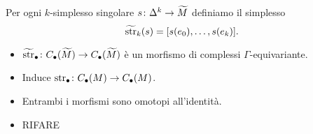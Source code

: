 \documentclass{beamer}
\begin{document}
\begin{frame}{\secname}{\subsecname}
Per ogni $k$-simplesso singolare $\map{s}{\Delta^k}{\widetilde M}$ definiamo il simplesso
\[
\widetilde{\operatorname{str}}_k(s)=[s(e_0),\ldots,s(e_k)].
\]

\begin{minipage}[t]{.6\textwidth}
\begin{itemize}
\item $\map{\tstr_\bul}{C_\bul(\widetilde M)}{C_\bul(\widetilde M)}$ è un morfismo di complessi $\Gamma$-equivariante.
\item Induce $\map{\str_\bul}{C_\bul(M)}{C_\bul(M)}$.
\item Entrambi i morfismi sono omotopi all'identità.
\end{itemize}
\end{minipage}
\begin{minipage}[t]{.35\textwidth}
\begin{itemize}
\item\huge RIFARE
\end{itemize}
\end{minipage}
\end{frame}
\end{document}
